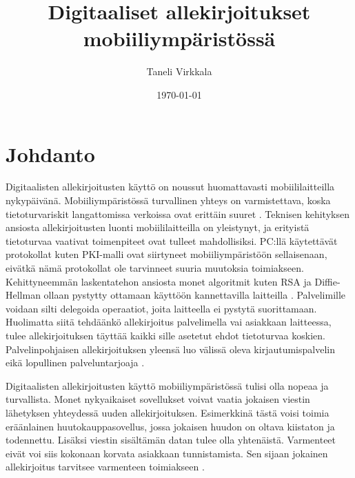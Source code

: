 \documentclass[finnish]{tktltiki2}
\title{Digitaaliset allekirjoitukset mobiiliympäristössä}
\author{Taneli Virkkala}
\date{\today}
\theoremstyle{definition}
\theoremstyle{remark}
\begin{document}

\frontmatter      %

\maketitle        %
\makeabstract     %

\tableofcontents  %


\mainmatter       %

\section{Johdanto}


Digitaalisten allekirjoitusten käyttö on noussut huomattavasti mobiililaitteilla nykypäivänä. Mobiiliympäristössä turvallinen yhteys on varmistettava, koska tietoturvariskit langattomissa verkoissa ovat erittäin suuret \cite{enti}. Teknisen kehityksen ansiosta allekirjoitusten luonti mobiililaitteilla on yleistynyt, ja erityistä tietoturvaa vaativat toimenpiteet ovat tulleet mahdollisiksi. PC:llä käytettävät protokollat kuten PKI-malli ovat siirtyneet mobiiliympäristöön sellaisenaan, eivätkä nämä protokollat ole tarvinneet suuria muutoksia toimiakseen. Kehittyneemmän laskentatehon ansiosta monet algoritmit kuten RSA ja Diffie-Hellman ollaan pystytty ottamaan käyttöön kannettavilla laitteilla \cite{enti}. Palvelimille voidaan silti delegoida operaatiot, joita laitteella ei pystytä suorittamaan. Huolimatta siitä tehdäänkö allekirjoitus palvelimella vai asiakkaan laitteessa, tulee allekirjoituksen täyttää kaikki sille asetetut ehdot tietoturvaa koskien. Palvelinpohjaisen allekirjoituksen yleensä luo välissä oleva kirjautumispalvelin eikä lopullinen palveluntarjoaja \cite{proxy}.

Digitaalisten allekirjoitusten käyttö mobiiliympäristössä tulisi olla nopeaa ja turvallista. Monet nykyaikaiset sovellukset voivat vaatia jokaisen viestin lähetyksen yhteydessä uuden allekirjoituksen. Esimerkkinä tästä voisi toimia eräänlainen huutokauppasovellus, jossa jokaisen huudon on oltava kiistaton ja todennettu. Lisäksi viestin sisältämän datan tulee olla yhtenäistä. Varmenteet eivät voi siis kokonaan korvata asiakkaan tunnistamista. Sen sijaan jokainen allekirjoitus tarvitsee varmenteen toimiakseen \cite{proxy}.
\end{document}

